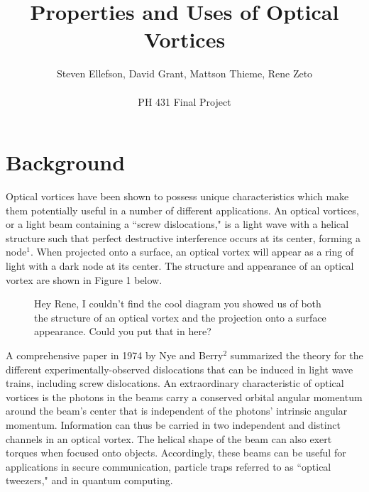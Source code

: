 \documentclass{article}
\begin{document}
\chead{}
\title{Properties and Uses of Optical Vortices}
\author{Steven Ellefson, David Grant, Mattson Thieme, Rene Zeto\\\\PH 431 Final Project}
\maketitle

\section*{Background}
Optical vortices have been shown to possess unique characteristics which make them potentially useful in a number of different applications. An optical vortices, or a light beam containing a ``screw dislocations," is a light wave with a helical structure such that perfect destructive interference occurs at its center, forming a node$^{1}$. When projected onto a surface, an optical vortex will appear as a ring of light with a dark node at its center. The structure and appearance of an optical vortex are shown in Figure 1 below.

\begin{figure}[hc]
		\centering
			\caption{Hey Rene, I couldn't find the cool diagram you showed us of both the structure of an optical vortex and the projection onto a surface appearance. Could you put that in here? }
		\end{figure}
		
A comprehensive paper in 1974 by Nye and Berry$^{2}$ summarized the theory for the different experimentally-observed dislocations that can be induced in light wave trains, including screw dislocations. An extraordinary characteristic of optical vortices is the photons in the beams carry a conserved orbital angular momentum around the beam's center that is independent of the photons' intrinsic angular momentum. Information can thus be carried in two independent and distinct channels in an optical vortex. The helical shape of the beam can also exert torques when focused onto objects. Accordingly, these beams can be useful for applications in secure communication, particle traps referred to as ``optical tweezers," and in quantum computing.\\\\\\
\end{document}
